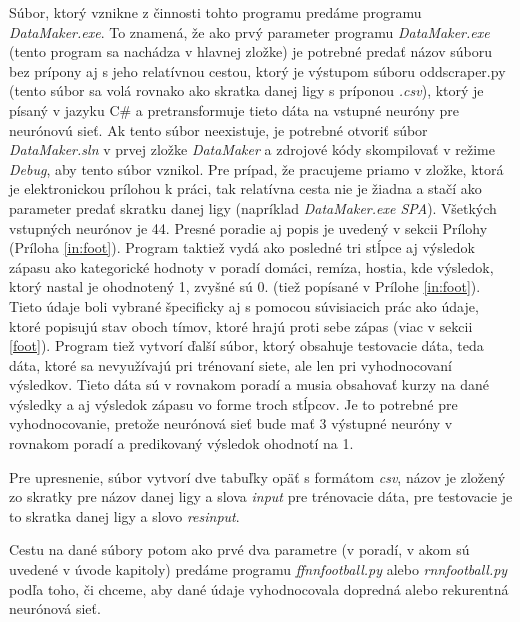 Súbor, ktorý vznikne z činnosti tohto programu predáme programu \textit{DataMaker.exe}. 
To znamená, že ako prvý parameter programu \textit{DataMaker.exe} (tento program sa nachádza v hlavnej zložke) je potrebné predať názov súboru bez prípony aj s jeho relatívnou cestou, ktorý je výstupom súboru oddscraper.py (tento súbor sa volá rovnako ako skratka danej ligy s príponou \textit{.csv}), ktorý je písaný v jazyku C\# a pretransformuje tieto dáta na vstupné neuróny pre neurónovú sieť. 
Ak tento súbor neexistuje, je potrebné otvoriť súbor \textit{DataMaker.sln} v prvej zložke \textit{DataMaker} a zdrojové kódy skompilovať v režime \textit{Debug}, aby tento súbor vznikol.
Pre prípad, že pracujeme priamo v zložke, ktorá je elektronickou prílohou k práci, tak relatívna cesta nie je žiadna a stačí ako parameter predať skratku danej ligy (napríklad \textit{DataMaker.exe SPA}).
Všetkých vstupných neurónov je 44. 
Presné poradie aj popis je uvedený v sekcii Prílohy (Príloha \ref{in:foot}).
Program taktiež vydá ako posledné tri stĺpce aj výsledok zápasu ako kategorické hodnoty v poradí domáci, remíza, hostia, kde výsledok, ktorý nastal je ohodnotený 1, zvyšné sú 0. (tiež popísané v Prílohe \ref{in:foot}).
Tieto údaje boli vybrané špecificky aj s pomocou súvisiacich prác ako údaje, ktoré popisujú stav oboch tímov, ktoré hrajú proti sebe zápas (viac v sekcii \ref{foot}). 
Program tiež vytvorí ďalší súbor, ktorý obsahuje testovacie dáta, teda dáta, ktoré sa nevyužívajú pri trénovaní siete, ale len pri vyhodnocovaní výsledkov. 
Tieto dáta sú v rovnakom poradí a musia obsahovať kurzy na dané výsledky a aj výsledok zápasu vo forme troch stĺpcov.
Je to potrebné pre vyhodnocovanie, pretože neurónová sieť bude mať 3 výstupné neuróny v rovnakom poradí a predikovaný výsledok ohodnotí na 1.

Pre upresnenie, súbor vytvorí dve tabuľky opäť s formátom \textit{csv}, názov je zložený zo skratky pre názov danej ligy a slova \textit{input} pre trénovacie dáta, pre testovacie je to skratka danej ligy a slovo \textit{resinput}.

Cestu na dané súbory potom ako prvé dva parametre (v poradí, v akom sú uvedené v úvode kapitoly) predáme programu \textit{ffnnfootball.py} alebo \textit{rnnfootball.py} podľa toho, či chceme, aby dané údaje vyhodnocovala dopredná alebo rekurentná neurónová sieť.

